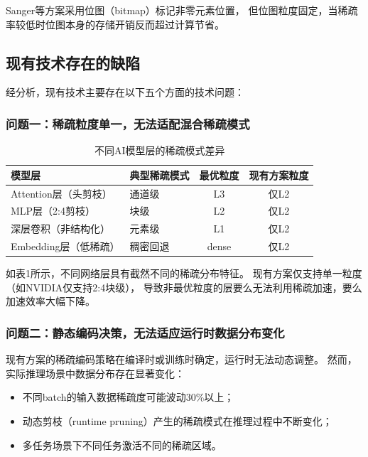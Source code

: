 \documentclass[a4paper,12pt,fontset=ubuntu]{ctexart}
\begin{document}
Sanger等方案采用位图（bitmap）标记非零元素位置，
但位图粒度固定，当稀疏率较低时位图本身的存储开销反而超过计算节省。

\subsection{现有技术存在的缺陷}

经分析，现有技术主要存在以下五个方面的技术问题：

\subsubsection{问题一：稀疏粒度单一，无法适配混合稀疏模式}

\begin{table}[htbp]
\centering
\caption{不同AI模型层的稀疏模式差异}
\begin{tabular}{llcc}
\toprule
\textbf{模型层} & \textbf{典型稀疏模式} & \textbf{最优粒度} & \textbf{现有方案粒度} \\
\midrule
Attention层（头剪枝） & 通道级 & L3 & 仅L2 \\
MLP层（2:4剪枝） & 块级 & L2 & 仅L2 \\
深层卷积（非结构化） & 元素级 & L1 & 仅L2 \\
Embedding层（低稀疏） & 稠密回退 & dense & 仅L2 \\
\bottomrule
\end{tabular}
\end{table}

如表1所示，不同网络层具有截然不同的稀疏分布特征。
现有方案仅支持单一粒度（如NVIDIA仅支持2:4块级），
导致非最优粒度的层要么无法利用稀疏加速，要么加速效率大幅下降。

\subsubsection{问题二：静态编码决策，无法适应运行时数据分布变化}

现有方案的稀疏编码策略在编译时或训练时确定，运行时无法动态调整。
然而，实际推理场景中数据分布存在显著变化：

\begin{itemize}
  \item 不同batch的输入数据稀疏度可能波动30\%以上；
  \item 动态剪枝（runtime pruning）产生的稀疏模式在推理过程中不断变化；
  \item 多任务场景下不同任务激活不同的稀疏区域。
\end{itemize}
\end{document}
